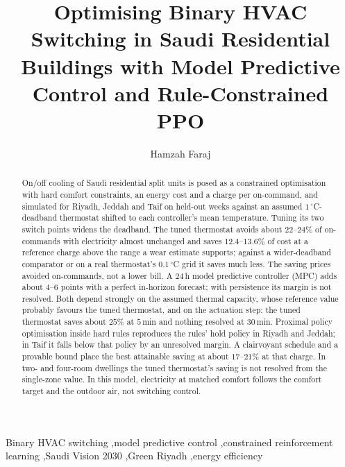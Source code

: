 \documentclass[3p,twocolumn,number]{elsarticle}
\begin{document}
 
\begin{frontmatter}
 
\title{Optimising Binary HVAC Switching in Saudi Residential Buildings with Model
Predictive Control and Rule-Constrained PPO}

\author[tu]{Hamzah Faraj}

 
\begin{abstract}
On/off cooling of Saudi residential split units is posed as a constrained optimisation with hard comfort constraints, an energy cost and a charge per on-command, and simulated for Riyadh, Jeddah and Taif on held-out weeks against an assumed $1\,^\circ$C-deadband thermostat shifted to each controller's mean temperature. Tuning its two switch points widens the deadband. The tuned thermostat avoids about $22$--$24\%$ of on-commands with electricity almost unchanged and saves $12.4$--$13.6\%$ of cost at a reference charge above the range a wear estimate supports; against a wider-deadband comparator or on a real thermostat's $0.1\,^\circ$C grid it saves much less. The saving prices avoided on-commands, not a lower bill. A $24\,$h model predictive controller (MPC) adds about $4$--$6$ points with a perfect in-horizon forecast; with persistence its margin is not resolved. Both depend strongly on the assumed thermal capacity, whose reference value probably favours the tuned thermostat, and on the actuation step: the tuned thermostat saves about $25\%$ at $5\,$min and nothing resolved at $30\,$min. Proximal policy optimisation inside hard rules reproduces the rules' hold policy in Riyadh and Jeddah; in Taif it falls below that policy by an unresolved margin. A clairvoyant schedule and a provable bound place the best attainable saving at about $17$--$21\%$ at that charge. In two- and four-room dwellings the tuned thermostat's saving is not resolved from the single-zone value. In this model, electricity at matched comfort follows the comfort target and the outdoor air, not switching control.
\end{abstract}
 
\begin{keyword}
Binary HVAC switching \sep model predictive control \sep constrained reinforcement learning \sep Saudi Vision 2030 \sep Green Riyadh \sep energy efficiency
\end{keyword}
 
\end{frontmatter}
 
\end{document}
